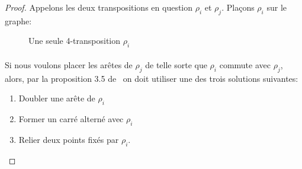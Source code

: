 \begin{proof}
  Appelons les deux transpositions en question $\rho_i$ et $\rho_j$. Plaçons $\rho_i$ sur le graphe:

  \begin{figure}[H]
    \begin{center}
      \caption{Une seule 4-transposition $\rho_i$}
    \end{center}
  \end{figure}

  \paragraph{}
  Si nous voulons placer les arêtes de $\rho_j$ de telle sorte que $\rho_i$ commute avec $\rho_j$, alors, par la proposition 3.5 de~\cite{cprGraph} on doit utiliser une des trois solutions suivantes:
  \begin{enumerate}
    \item Doubler une arête de $\rho_i$
    \item Former un carré alterné avec $\rho_i$
    \item Relier deux points fixés par $\rho_i$.
  \end{enumerate}


\end{proof}
